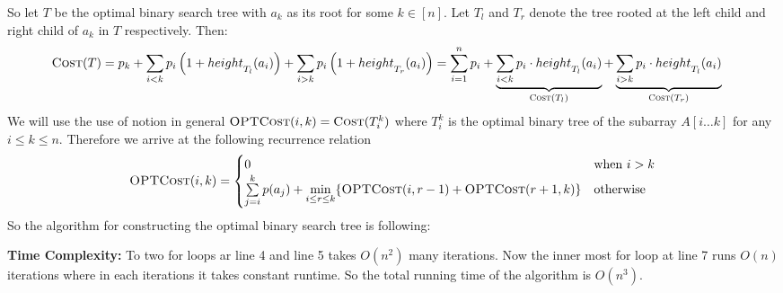 So let $T$ be the optimal binary search tree with $a_k$ as its root for some $k\in[n]$. Let $T_l$ and $T_r$ denote the tree rooted at the left child and right child of $a_k$ in $T$ respectively. Then: \begin{align*}
	\textsc{Cost}(T) & = p_k+ {\sum_{i<k}p_i\left(1+height\strut_{T_l}(a_i)\right)}+{\sum_{i>k}p_i\left(1+height\strut_{T_r}(a_i)\right)} = \sum_{i=1}^n p_i+\underbrace{\sum_{i<k}p_i \cdot height\strut_{T_l}(a_i)}_{\textsc{Cost}(T_l)}+\underbrace{\sum_{i>k}p_i \cdot height\strut_{T_l}(a_i)}_{\textsc{Cost}(T_r)}
\end{align*}
We will use the use of notion  in general $\textsc{OPTCost}(i,k)=\textsc{Cost}(T_i^k)$ where $T_i^k$ is the optimal binary tree of the subarray $A[i\dots k]$ for any $i\leq k\leq n$.  Therefore we arrive at the following recurrence relation $$\textsc{OPTCost}(i,k)=\begin{cases}
	0&\text{when $i>k$}\\
	\sum\limits_{j=i}^k p(a_j)+\min\limits_{i\leq r\leq k}\{\textsc{OPTCost}(i,r-1)+\textsc{OPTCost}(r+1,k)\} & \text{otherwise}
\end{cases}$$
So the algorithm for constructing the optimal binary search tree is following:
\begin{algorithm}
\DontPrintSemicolon
\caption{$(A,P)$}
\end{algorithm}\parinf

\textbf{Time Complexity:} To two for loops ar line 4 and line 5 takes $O(n^2)$ many iterations. Now the inner most for loop at line 7 runs $O(n)$ iterations where in each iterations it takes constant runtime. So the total running time of the algorithm is $O(n^3)$.